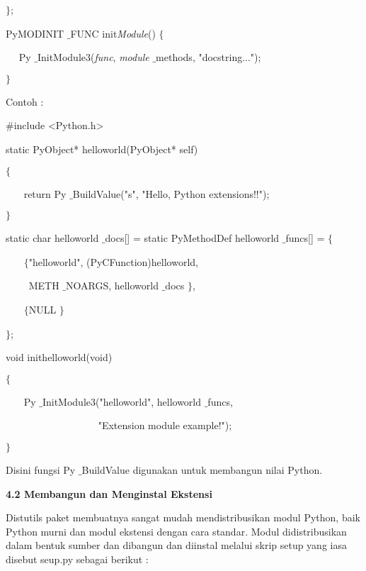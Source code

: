  $  \}  $; 
\vspace{12pt}

PyMODINIT $  \_  $FUNC init\textit{Module}()  $  \{  $ 
 
~~ Py $  \_  $InitModule3(\textit{func}, \textit{module} $  \_  $methods, "docstring..."); 

 $  \}  $ 
\vspace{12pt}
\vspace{12pt}

Contoh : 
 
 $  \#  $include <Python.h> 
\vspace{12pt}
 
static PyObject* helloworld(PyObject* self) 

 $  \{  $ 
 
~~~ return Py $  \_  $BuildValue("s", "Hello, Python extensions!!"); 

 $  \}  $ 
\vspace{12pt}
 
static char helloworld $  \_  $docs[] = 
static PyMethodDef helloworld $  \_  $funcs[] =  $  \{  $ 

~~~  $  \{  $"helloworld", (PyCFunction)helloworld,  

~~~~ METH $  \_  $NOARGS, helloworld $  \_  $docs $  \}  $, 

~~~  $  \{  $NULL $  \}  $
 
 $  \}  $; 
\vspace{12pt}

void inithelloworld(void) 
 
 $  \{  $ 

~~~ Py $  \_  $InitModule3("helloworld", helloworld $  \_  $funcs, 

~~~~~~~~~~~~~~~~~~ "Extension module example!"); 
 
 $  \}  $ 
\vspace{12pt}
\vspace{12pt}
 
 \hspace*{0.5in} Disini fungsi Py $  \_  $BuildValue digunakan untuk membangun nilai Python.  
\vspace{12pt}
\vspace{12pt}
 
\textbf{4.2 Membangun dan Menginstal Ekstensi} 
\vspace{12pt}
\vspace{12pt}

 \hspace*{0.5in} Distutils paket membuatnya sangat mudah mendistribusikan modul Python, baik Python murni dan modul ekstensi dengan cara standar. Modul didistribusikan dalam bentuk sumber dan dibangun dan diinstal melalui skrip setup yang iasa disebut seup.py sebagai berikut : 
 
